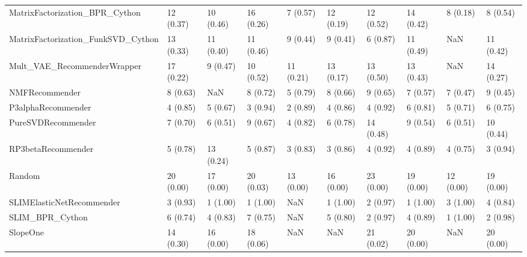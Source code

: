\begin{tabular}{llllllllll}
     MatrixFactorization\_BPR\_Cython &                12 (0.37) &   10 (0.46) &     16 (0.26) &     7 (0.57) &            12 (0.19) &           12 (0.52) &         14 (0.42) &           8 (0.18) &          8 (0.54) \\
 MatrixFactorization\_FunkSVD\_Cython &                13 (0.33) &   11 (0.40) &     11 (0.46) &     9 (0.44) &             9 (0.41) &            6 (0.87) &         11 (0.49) &                NaN &         11 (0.42) \\
        Mult\_VAE\_RecommenderWrapper &                17 (0.22) &    9 (0.47) &     10 (0.52) &    11 (0.21) &            13 (0.17) &           13 (0.50) &         13 (0.43) &                NaN &         14 (0.27) \\
                     NMFRecommender &                 8 (0.63) &         NaN &      8 (0.72) &     5 (0.79) &             8 (0.66) &            9 (0.65) &          7 (0.57) &           7 (0.47) &          9 (0.45) \\
                 P3alphaRecommender &                 4 (0.85) &    5 (0.67) &      3 (0.94) &     2 (0.89) &             4 (0.86) &            4 (0.92) &          6 (0.81) &           5 (0.71) &          6 (0.75) \\
                 PureSVDRecommender &                 7 (0.70) &    6 (0.51) &      9 (0.67) &     4 (0.82) &             6 (0.78) &           14 (0.48) &          9 (0.54) &           6 (0.51) &         10 (0.44) \\
                 RP3betaRecommender &                 5 (0.78) &   13 (0.24) &      5 (0.87) &     3 (0.83) &             3 (0.86) &            4 (0.92) &          4 (0.89) &           4 (0.75) &          3 (0.94) \\
                             Random &                20 (0.00) &   17 (0.00) &     20 (0.03) &    13 (0.00) &            16 (0.00) &           23 (0.00) &         19 (0.00) &          12 (0.00) &         19 (0.00) \\
          SLIMElasticNetRecommender &                 3 (0.93) &    1 (1.00) &      1 (1.00) &          NaN &             1 (1.00) &            2 (0.97) &          1 (1.00) &           3 (1.00) &          4 (0.84) \\
                    SLIM\_BPR\_Cython &                 6 (0.74) &    4 (0.83) &      7 (0.75) &          NaN &             5 (0.80) &            2 (0.97) &          4 (0.89) &           1 (1.00) &          2 (0.98) \\
                           SlopeOne &                14 (0.30) &   16 (0.00) &     18 (0.06) &          NaN &                  NaN &           21 (0.02) &         20 (0.00) &                NaN &         20 (0.00) \\

\end{tabular}

